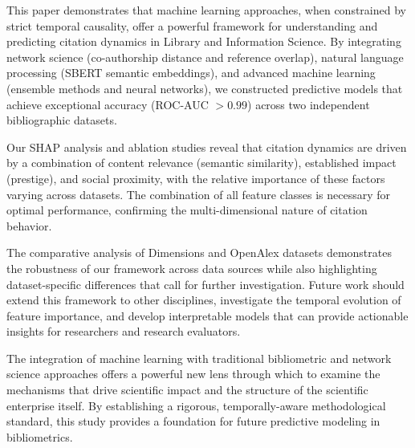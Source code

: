 \documentclass[12pt,a4paper]{article}
\begin{document}
This paper demonstrates that machine learning approaches, when constrained by strict temporal causality, offer a powerful framework for understanding and predicting citation dynamics in Library and Information Science. By integrating network science (co-authorship distance and reference overlap), natural language processing (SBERT semantic embeddings), and advanced machine learning (ensemble methods and neural networks), we constructed predictive models that achieve exceptional accuracy (ROC-AUC $> 0.99$) across two independent bibliographic datasets.

Our SHAP analysis and ablation studies reveal that citation dynamics are driven by a combination of content relevance (semantic similarity), established impact (prestige), and social proximity, with the relative importance of these factors varying across datasets. The combination of all feature classes is necessary for optimal performance, confirming the multi-dimensional nature of citation behavior.

The comparative analysis of Dimensions and OpenAlex datasets demonstrates the robustness of our framework across data sources while also highlighting dataset-specific differences that call for further investigation. Future work should extend this framework to other disciplines, investigate the temporal evolution of feature importance, and develop interpretable models that can provide actionable insights for researchers and research evaluators.

The integration of machine learning with traditional bibliometric and network science approaches offers a powerful new lens through which to examine the mechanisms that drive scientific impact and the structure of the scientific enterprise itself. By establishing a rigorous, temporally-aware methodological standard, this study provides a foundation for future predictive modeling in bibliometrics.

\newpage


\end{document}

